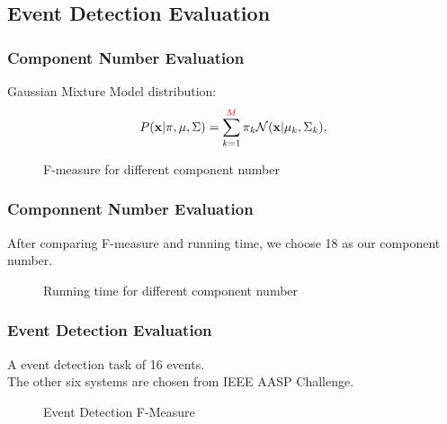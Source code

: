 \documentclass[xcolor=table,slidestop,compress,mathserif]{beamer}
\begin{document}
\subsection{Event Detection Evaluation}
\begin{frame}
	\frametitle{Component Number Evaluation}
	Gaussian Mixture Model distribution: \\ 
	\begin{equation}
	P(\mathbf{x}|\mathbf{\pi},\mathbf{\mu},\Sigma) = \sum_{k = 1}^{\textcolor{red}{M}} \pi_k
	\mathcal{N}(\mathbf{x}|\mathbf{\mu}_k, \Sigma_k),
	\end{equation} 

	\begin{figure}[htb!]
	\centering
	\resizebox{0.75\totalheight}{!}{}
	\caption{F-measure for different component number}
	\label{fig:component}
	\end{figure}
\end{frame}
\begin{frame}
	\frametitle{Componnent Number Evaluation}
	After comparing F-measure and running time, we choose 18 as our component number. 
	\begin{figure}[htb!]
	\centering
	\resizebox{0.8\totalheight}{!}{}
	\caption{Running time for different component number}
	\label{fig:component}
	\end{figure}
\end{frame}
\begin{frame}
	\frametitle{Event Detection Evaluation}
	A event detection task of 16 events. \\ 
	The other six systems are chosen from IEEE AASP Challenge. 
	\begin{figure}[htb!]
	\centering
	\resizebox{0.8\totalheight}{!}{}
	\caption{Event Detection F-Measure}
	\label{fig:eventdetectF1}
	\end{figure}
\end{frame}
\end{document}
